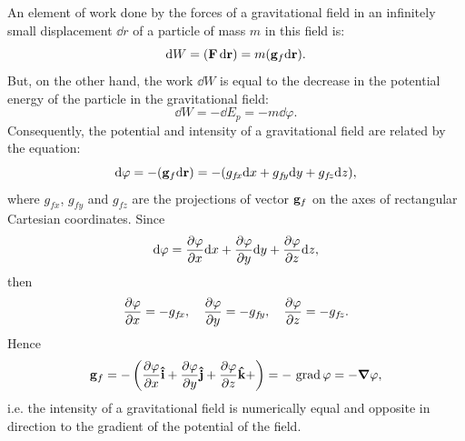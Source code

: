 \subsection{}\label{6.2.5} An element of work done by the forces of a gravitational field in an infinitely small displacement $\dd r$ of a particle of mass $m$ in this field is:
\begin{equation*}%
\dd W = (\vb{F} \,\dd \vb{r}) = m (\vb{g}_{f} \dd \vb{r}).
\end{equation*}
But, on the other hand, the work $\dd W$ is equal to the decrease in the potential energy of the particle in the gravitational field:
\begin{equation*}%
\dd W = - \dd E_{p} = - m \dd \varphi.
\end{equation*}
Consequently, the potential and intensity of a gravitational field are related by the equation:
\begin{equation*}%
\dd \varphi = -(\vb{g}_{f} \dd \vb{r}) = -(g_{f\!x}\dd x + g_{f\!y}\dd y +g_{f\!z}\dd z),
\end{equation*}
where $g_{f\!x}$, $g_{f\!y}$ and $g_{f\!z}$ are the projections of vector $\vb{g}_{f}$ on the axes of rectangular Cartesian coordinates. Since
\begin{equation*}%
\dd \varphi = \pdv{\varphi}{x} \dd x + \pdv{\varphi}{y} \dd y + \pdv{\varphi}{z} \dd z,
\end{equation*}
then
\begin{equation*}%
\pdv{\varphi}{x}  = -g_{f\!x},\quad \pdv{\varphi}{y}  = -g_{f\!y},\quad\pdv{\varphi}{z}  = -g_{f\!z}.
\end{equation*}
Hence
\begin{equation*}%
\vb{g}_{f}  = - \left(\pdv{\varphi}{x}\vu{i} +\pdv{\varphi}{y}\vu{j} + \pdv{\varphi}{z}\vu{k} + \right) = - \,\,\textrm{grad} \,\varphi = -\grad \varphi,
\end{equation*}
i.e. the intensity of a gravitational field is numerically equal and opposite in direction to the gradient of the potential of the field.

